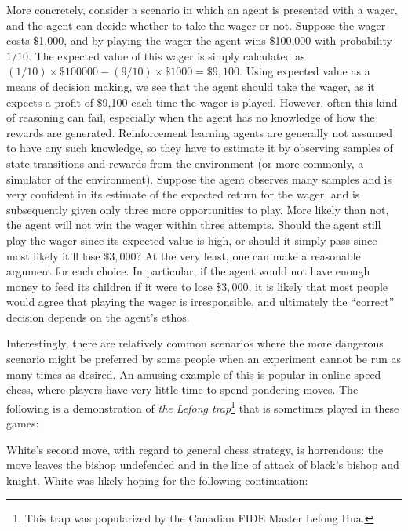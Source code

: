 More concretely, consider a scenario in which an agent is presented
with a wager, and the agent can decide whether to take the wager or
not. Suppose the wager costs \$1,000, and by playing the wager the agent
wins \$100,000 with probability $1/10$. The expected value of this
wager is simply calculated as $(1/10)\times \$100000 - (9/10)\times
\$1000 = \$9,100$. Using expected value as a means of decision making,
we see that the agent should take the wager, as it expects a profit of
\$9,100 each time the wager is played. However, often this kind of
reasoning can fail, especially when the agent has no knowledge of how
the rewards are generated. Reinforcement learning agents are generally
not assumed to have any such knowledge, so they have to estimate it by
observing samples of state transitions and rewards from the
environment (or more commonly, a simulator of the
environment). Suppose the agent observes many samples and is very
confident in its estimate of the expected return for the wager, and is
subsequently given only three more opportunities to play. More likely
than not, the agent will not win the wager within three
attempts. Should the agent still play the wager since its expected
value is high, or should it simply pass since most likely it'll lose
$\$3,000$? At the very least, one can make a reasonable argument for
each choice. In particular, if the agent would not have enough money to
feed its children if it were to lose $\$3,000$, it is likely that most
people would agree that playing the wager is irresponsible, and
ultimately the ``correct'' decision depends on the agent's ethos.

Interestingly, there are relatively common scenarios where
the more dangerous scenario might be preferred by some people when an
experiment cannot be run as many times as desired. An amusing example
of this is popular in online speed chess, where players have very
little time to spend pondering moves. The following is a demonstration
of \emph{the Lefong trap}\footnote{This trap was popularized by the
  Canadian FIDE Master Lefong Hua.} that is sometimes played in these games:

\begin{center}
\newgame


\showboard
\end{center}

White's second move, with regard to general chess strategy, is
horrendous: the move leaves the bishop undefended and in the line of
attack of black's bishop and knight. White was likely hoping for the
following continuation:

